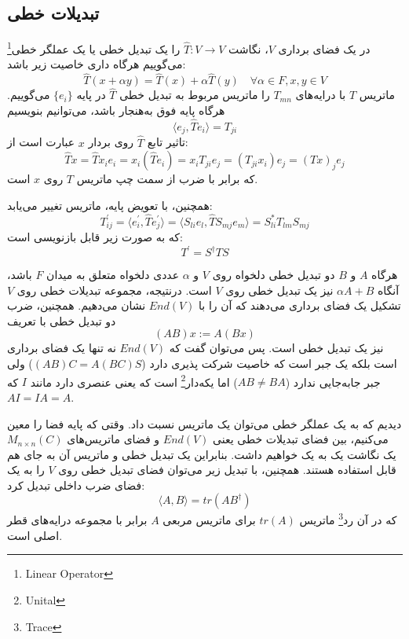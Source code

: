 \subsection{تبدیلات خطی}
در یک فضای برداری  $V$، نگاشت 
$\hat{T} : V \rightarrow V$ را یک تبدیل خطی یا یک عملگر خطی\footnote{Linear Operator} می‌گوییم هرگاه داری خاصیت زیر باشد:
\begin{equation}
	\hat{T}(x + \alpha y ) = \hat{T}(x) + \alpha \hat{T}(y) \quad \forall \alpha \in F, x,y \in V
\end{equation}
ماتریس $T$ با درایه‌های $T_{mn}$ را ماتریس مربوط به تبدیل خطی $\hat{T}$ در پایه $\{e_{i}\}$ می‌گوییم. هرگاه پایه فوق به‌هنجار باشد، می‌توانیم بنویسیم 
\begin{equation}
	\langle e_{j}, \hat{T}e_{i} \rangle = T_{ji}
\end{equation}
تاثیر تابع $\hat{T}$ روی بردار $x$ عبارت است از:
\begin{equation}
	\hat{T}x = \hat{T}x_{i}e_{i} = x_{i}(\hat{T}e_{i}) = x_{i}T_{ji}e_{j} = (T_{ji}x_{i})e_{j} = (Tx)_{j}e_{j}
\end{equation}
که برابر با ضرب از سمت چپ ماتریس $T$ روی $x$ است. 

همچنین، با تعویض پایه، ماتریس تغییر می‌یابد:
\begin{equation}
	T^{'}_{ij} = \langle e^{'}_{i},\hat{T}e^{'}_{j} \rangle = \langle S_{li}e_{l},\hat{T}S_{mj}e_{m} \rangle = S^{*}_{li}T_{lm}S_{mj}
\end{equation}
که به صورت زیر قابل بازنویسی است:
\begin{equation}
T^{'} = S^{\dagger}TS
\end{equation}

هرگاه $A$ و $B$ دو تبدیل خطی دلخواه روی $V$ و $\alpha$ عددی دلخواه متعلق به میدان $F$ باشد، آنگاه $\alpha A+B$ نیز یک تبدیل خطی روی $V$ است. درنتیجه، مجموعه تبدیلات خطی روی $V$ تشکیل یک فضای برداری می‌دهند که آن را با $End(V)$ نشان می‌دهیم. همچنین، ضرب دو تبدیل خطی با تعریف 
\begin{equation}
	(AB)x := A(Bx)
\end{equation}
 نیز یک تبدیل خطی است. پس می‌توان گفت که $End(V)$ نه تنها یک فضای برداری است بلکه یک جبر است که خاصیت شرکت پذیری دارد ($(AB)C = A(BC)S$) ولی جبر جابه‌جایی ندارد ($AB \ne BA$) اما یکه‌دار\footnote{Unital} است که یعنی عنصری دارد مانند $I$ که $AI = IA = A$. 
 
 دیدیم که به یک عملگر خطی می‌توان یک ماتریس نسبت داد. وقتی که پایه فضا را معین می‌کنیم، بین فضای تبدیلات خطی یعنی $End(V)$ و فضای ماتریس‌های $M_{n \times n}(C)$ یک نگاشت یک به یک خواهیم داشت. بنابراین یک تبدیل خطی و ماتریس آن به جای هم قابل استفاده هستند. همچنین، با تبدیل زیر می‌توان فضای تبدیل خطی روی $V$ را به یک فضای ضرب داخلی تبدیل کرد:
  \begin{equation}
  	\langle A,B \rangle = tr(AB^{\dagger})
  \end{equation}
  که در آن رد\footnote{Trace} ماتریس $tr(A)$ برای ماتریس مربعی $A$ برابر با مجموعه درایه‌های قطر اصلی است.
  
